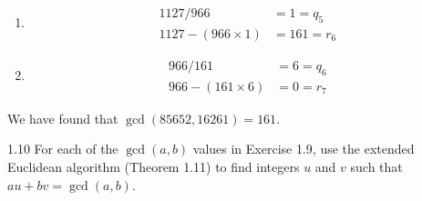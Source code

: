 {\begin{enumerate}
\begin{enumerate}[label=(\arabic*)]
                        \begin{align*}
                            3220 / 1127            & = 2 = q_4   \\
                            3220 - (1127 \times 2) & = 966 = r_5
                        \end{align*}
                  \item
                        \begin{align*}
                            1127 / 966            & = 1 = q_5   \\
                            1127 - (966 \times 1) & = 161 = r_6
                        \end{align*}
                  \item
                        \begin{align*}
                            966 / 161            & = 6 = q_6 \\
                            966 - (161 \times 6) & = 0 = r_7
                        \end{align*}
              \end{enumerate}
              We have found that \(\gcd(85652,16261) = 161\).

    \end{enumerate}
}

\begin{exercise}
    {1.10} For each of the \(\gcd(a, b)\) values in Exercise 1.9, use the extended Euclidean
    algorithm (Theorem 1.11) to find integers \(u\) and \(v\) such that \(au + bv = \gcd(a, b)\).
\end{exercise}

